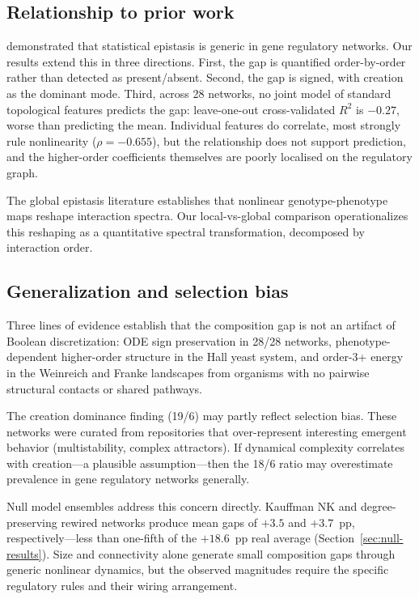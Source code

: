 \documentclass[10pt]{article}
\begin{document}
\subsection{Relationship to prior work}

\citet{gjuvsland2007statistical} demonstrated that
statistical epistasis is generic in gene regulatory networks. Our
results extend this in three directions. First, the gap is quantified
order-by-order rather than detected as present/absent. Second, the
gap is signed, with creation as the dominant mode. Third, across 28
networks, no joint model of standard topological features predicts the
gap: leave-one-out cross-validated $R^2$ is $-0.27$, worse than
predicting the mean. Individual features do correlate, most strongly
rule nonlinearity ($\rho = -0.655$), but the relationship does not
support prediction, and the higher-order coefficients themselves are
poorly localised on the regulatory graph.

The global epistasis literature \citep{otwinowski2018inferring, reddy2021global} establishes that nonlinear genotype-phenotype maps
reshape interaction spectra. Our local-vs-global comparison
operationalizes this reshaping as a quantitative spectral
transformation, decomposed by interaction order.


\subsection{Generalization and selection bias}

Three lines of evidence establish that the composition gap is not an
artifact of Boolean discretization: ODE sign preservation in 28/28
networks, phenotype-dependent higher-order structure in the Hall
yeast system, and order-3+ energy in the Weinreich and Franke
landscapes from organisms with no pairwise structural contacts or
shared pathways.

The creation dominance finding (19/6) may partly reflect selection
bias. These networks were curated from repositories that
over-represent interesting emergent behavior (multistability, complex
attractors). If dynamical complexity correlates with creation---a
plausible assumption---then the 18/6 ratio may overestimate
prevalence in gene regulatory networks generally.

Null model ensembles address this concern directly. Kauffman NK and
degree-preserving rewired networks produce mean gaps of $+3.5$ and
$+3.7$~pp, respectively---less than one-fifth of the $+18.6$~pp
real average (Section~\ref{sec:null-results}). Size and connectivity
alone generate small composition gaps through generic nonlinear
dynamics, but the observed magnitudes require the specific regulatory
rules and their wiring arrangement.
\end{document}

